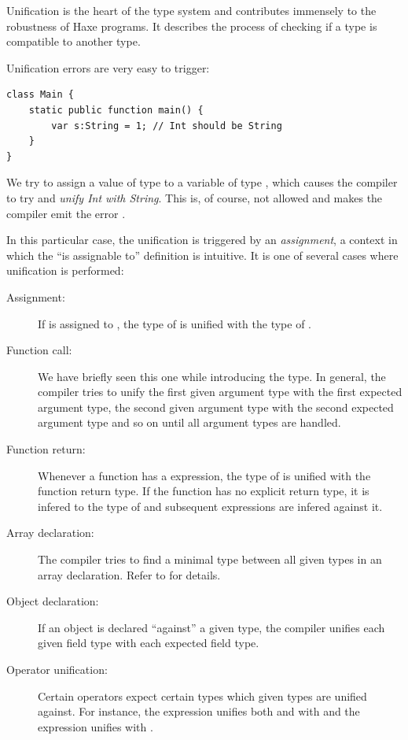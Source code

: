 \documentclass{haxe}
\begin{document}
Unification is the heart of the type system and contributes immensely to the robustness of Haxe programs. It describes the process of checking if a type is compatible to another type.


Unification errors are very easy to trigger:

\begin{lstlisting}
class Main {
	static public function main() {
		var s:String = 1; // Int should be String
	}
}
\end{lstlisting}
We try to assign a value of type  to a variable of type , which causes the compiler to try and \emph{unify Int with String}. This is, of course, not allowed and makes the compiler emit the error .

In this particular case, the unification is triggered by an \emph{assignment}, a context in which the ``is assignable to'' definition is intuitive. It is one of several cases where unification is performed:

\begin{description}
	\item[Assignment:] If  is assigned to , the type of  is unified with the type of .
	\item[Function call:] We have briefly seen this one while introducing the  type. In general, the compiler tries to unify the first given argument type with the first expected argument type, the second given argument type with the second expected argument type and so on until all argument types are handled.
	\item[Function return:] Whenever a function has a  expression, the type of  is unified with the function return type. If the function has no explicit return type, it is infered to the type of  and subsequent  expressions are infered against it.
	\item[Array declaration:] The compiler tries to find a minimal type between all given types in an array declaration. Refer to  for details.
	\item[Object declaration:] If an object is declared ``against'' a given type, the compiler unifies each given field type with each expected field type.
	\item[Operator unification:] Certain operators expect certain types which given types are unified against. For instance, the expression  unifies both  and  with  and the expression  unifies  with .
\end{description}
\end{document}

